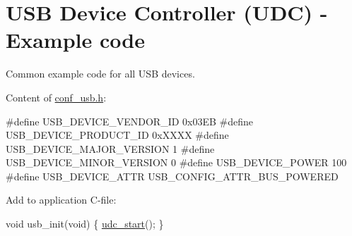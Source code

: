\hypertarget{group__udc__basic__use__case__setup__code}{\section{U\-S\-B Device Controller (U\-D\-C) -\/ Example code}
\label{group__udc__basic__use__case__setup__code}
}
Common example code for all U\-S\-B devices.

Content of \hyperlink{conf__usb_8h}{conf\-\_\-usb.\-h}\-: 
\begin{DoxyCode}
\textcolor{preprocessor}{        #define USB\_DEVICE\_VENDOR\_ID 0x03EB}
\textcolor{preprocessor}{}\textcolor{preprocessor}{        #define USB\_DEVICE\_PRODUCT\_ID 0xXXXX}
\textcolor{preprocessor}{}\textcolor{preprocessor}{        #define USB\_DEVICE\_MAJOR\_VERSION 1}
\textcolor{preprocessor}{}\textcolor{preprocessor}{        #define USB\_DEVICE\_MINOR\_VERSION 0}
\textcolor{preprocessor}{}\textcolor{preprocessor}{        #define USB\_DEVICE\_POWER 100}
\textcolor{preprocessor}{        #define USB\_DEVICE\_ATTR USB\_CONFIG\_ATTR\_BUS\_POWERED}
\end{DoxyCode}


Add to application C-\/file\-: 
\begin{DoxyCode}
        \textcolor{keywordtype}{void} usb\_init(\textcolor{keywordtype}{void})
        \{
          \hyperlink{group__udc__group__interne_gadf4e193509cd03ab6333d62629ea51e7}{udc\_start}();
        \}
\end{DoxyCode}
 